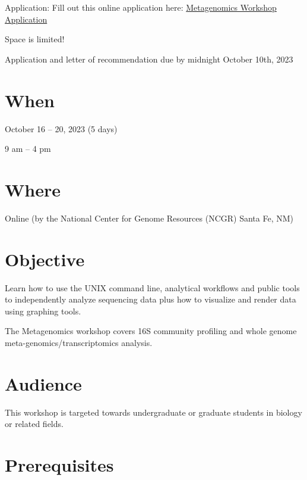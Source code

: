 \documentclass[
]{book}
\begin{document}
Application: Fill out this online application here: \href{https://sites.google.com/ncgr.org/ncgr-inbre/metagenomics?authuser=0}{Metagenomics Workshop Application}

Space is limited!

Application and letter of recommendation due by midnight October 10th, 2023

\hypertarget{when-3}{%
\section*{When}\label{when-3}}

October 16 -- 20, 2023 (5 days)

9 am -- 4 pm

\hypertarget{where-2}{%
\section*{Where}\label{where-2}}

Online (by the National Center for Genome Resources (NCGR) Santa Fe, NM)

\hypertarget{objective-2}{%
\section*{Objective}\label{objective-2}}

Learn how to use the UNIX command line, analytical workflows and public tools to independently analyze sequencing data plus how to visualize and render data using graphing tools.

The Metagenomics workshop covers 16S community profiling and whole genome meta-genomics/transcriptomics analysis.

\hypertarget{audience-2}{%
\section*{Audience}\label{audience-2}}

This workshop is targeted towards undergraduate or graduate students in biology or related fields.

\hypertarget{prerequisites-2}{%
\section*{Prerequisites}\label{prerequisites-2}}
\end{document}
